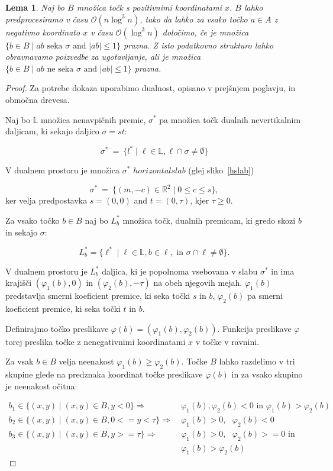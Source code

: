 \documentclass[a4paper, 12pt]{book}
\newcommand{\LL}{\ensuremath{\mathbb L}}
\newcommand{\RR}{\ensuremath{\mathbb R}}  %
\newcommand{\OO}{\ensuremath{\mathcal{O}}} %
\newtheorem{lema}[izrek]{Lema}
\begin{document}
\begin{lema}
\label{lema-ds2}
Naj bo $B$ množica točk s pozitivnimi koordinatami $x$. $B$ lahko predprocesiramo v času $\OO(n\log^3n)$, tako da lahko za vsako točko $a\in A$ z negativno koordinato $x$ v času $\OO(\log^3n)$ določimo, če je množica $\{ b\in B \mid \text{$ab$ seka $\sigma$ and $|ab|\le 1$}\}$ prazna. Z isto podatkovno strukturo lahko obravnavamo poizvedbe za ugotavljanje, ali je množica $\{ b\in B \mid \text{$ab$ ne seka $\sigma$ and $|ab|\le 1$}\}$ prazna.
\end{lema}

\begin{proof}
Za potrebe dokaza uporabimo dualnost, opisano v prejšnjem poglavju, in območna drevesa.

Naj bo $\LL$ množica nenavpičnih premic, $\sigma^*$ pa množica točk dualnih nevertikalnim daljicam, ki sekajo daljico $\sigma = st$:

\[
		\sigma^* ~=~ \{ l^* \mid \ell\in \LL, \ell\cap \sigma\neq \emptyset\} 
\]

V dualnem prostoru je množica $\sigma^*$ $horizontal slab$ (glej sliko~\ref{hslab})

\[
		\sigma^* ~=~ \{ (m,-c)\in \RR^2\mid 0\le c\le s\},
\]
ker velja predpostavka $s=(0,0)$ and $t=(0,\tau)$, kjer $\tau\ge 0$.


Za vsako točko $b\in B$ naj bo $L^* _b$ množica točk, dualnih premicam, ki gredo skozi $b$ in sekajo $\sigma$:

\[
		L^*_b=\{ \ell^* \mid \ell\in \LL, b \in \ell, \text{ in } \sigma\cap \ell\not= \emptyset\}.
	\]

V dualnem prostoru je $L^* _b$ daljica, ki je popolnoma vsebovana v slabu $\sigma^*$ in ima krajišči $(\varphi_1(b),0)$ in $(\varphi_2(b),-\tau)$ na obeh njegovih mejah. $\varphi_1(b)$ predstavlja smerni koeficient premice, ki seka točki $s$ in $b$, $\varphi_2(b)$ pa smerni koeficient premice, ki seka točki $t$ in $b$.

Definirajmo točko preslikave $\varphi(b)=(\varphi_1(b),\varphi_2(b))$. Funkcija preslikave $\varphi$ torej preslika točke z nenegativnimi koordinatami $x$ v točke v ravnini.

Za vsak $b\in B$ velja neenakost $\varphi_1(b) \geq \varphi_2(b)$. Točke $B$ lahko razdelimo v tri skupine glede na predznaka koordinat točke preslikave $\varphi(b)$ in za vsako skupino je neenakost očitna:

\begin{align*}
    b_1 \in \{ (x,y) \mid (x,y) \in B, y < 0 \} \Rightarrow &~ \varphi_1(b),\varphi_2(b) < 0 \text{ in } \varphi_1(b) > \varphi_2(b) \\
b_2 \in \{ (x,y) \mid (x,y) \in B, 0 <= y < \tau \} \Rightarrow &~ \varphi_1(b) > 0, \text{ } \varphi_2(b) < 0 \\
    b_3 \in \{ (x,y) \mid (x,y) \in B, y >= \tau \} \Rightarrow &~ \varphi_1(b) > 0, \text{ } \varphi_2(b) >= 0 \text{ in }\\ 
    &~\varphi_1(b) > \varphi_2(b)
\end{align*}


\end{proof}
\end{document}
